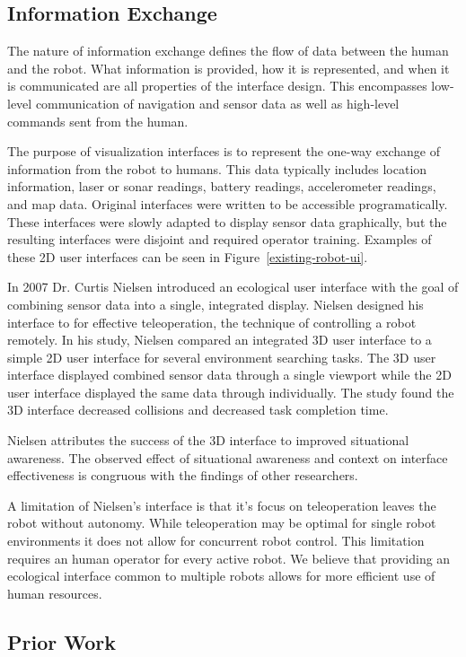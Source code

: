 \subsection{Information Exchange}
\label{sub:info_exchange}
The nature of information exchange defines the flow of data between the human and the robot. What information is provided, how it is represented, and when it is communicated are all properties of the interface design. This encompasses low-level communication of navigation and sensor data as well as high-level commands sent from the human. 

The purpose of visualization interfaces is to represent the one-way exchange of information from the robot to humans. This data typically includes location information, laser or sonar readings, battery readings, accelerometer readings, and map data. Original interfaces were written to be accessible programatically. These interfaces were slowly adapted to display sensor data graphically, but the resulting interfaces were disjoint and required operator training. Examples of these 2D user interfaces can be seen in Figure~\ref{existing-robot-ui}.

In 2007 Dr. Curtis Nielsen introduced an ecological user interface with the goal of combining sensor data into a single, integrated display. Nielsen designed his interface to for effective teleoperation, the technique of controlling a robot remotely. In his study, Nielsen compared an integrated 3D user interface to a simple 2D user interface for several environment searching tasks. The 3D user interface displayed combined sensor data through a single viewport while the 2D user interface displayed the same data through individually. The study found the 3D interface decreased collisions and decreased task completion time. \cite{Nielsen_Teleoperation}

Nielsen attributes the success of the 3D interface to improved situational awareness. The observed effect of situational awareness and context on interface effectiveness is congruous with the findings of other researchers. \cite{Nielsen_Teleoperation}

A limitation of Nielsen's interface is that it's focus on teleoperation leaves the robot without autonomy. While teleoperation may be optimal for single robot environments it does not allow for concurrent robot control. This limitation requires an human operator for every active robot. We believe that providing an ecological interface common to multiple robots allows for more efficient use of human resources.

\subsection{Prior Work} %
\label{sub:hri_prior_work}

